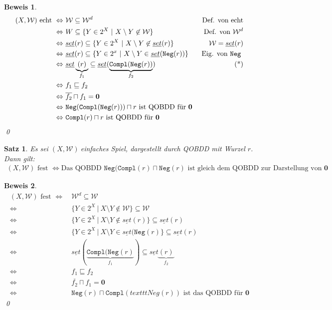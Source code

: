 \documentclass[ngerman]{scrartcl}
\theoremstyle{custom}
\newtheorem{ms}[mdef]{Satz}
\newtheorem*{bw}{Beweis}
\newcommand{\0}{\mathbf{0}}
\newcommand{\1}{\mathbf{L}}
\newcommand{\set}{\underline{set}}
\newcommand{\sg}{$(X,\mathcal{W})~$}
\newcommand{\W}{\mathcal{W}}
\begin{document}
\begin{bw}
\begin{align*}
(X,\W) \text{ echt } \Leftrightarrow&~ \W \subseteq \W^d & \text{
  Def. von echt}\\
\Leftrightarrow&~ W \subseteq \{Y \in 2^X ~|~ X \setminus Y \not \in
\W\} & \text{ Def. von } \W^d\\
\Leftrightarrow&~ \set(r) \subseteq \{Y \in 2^X ~|~ X \setminus Y \not
\in \set(r)\} & \W = \set(r)\\
\Leftrightarrow&~ \set(r) \subseteq \{Y \in 2^x ~|~ X \setminus Y \in
\set(\texttt{Neg}(r))\} & \text{ Eig. von \texttt{Neg} }\\
\Leftrightarrow&~ \set\underbrace{(r)}_{f_1} \subseteq
\set(\underbrace{\texttt{Compl}(\texttt{Neg}(r))}_{f_2}) &
\text{(*)}\\
\Leftrightarrow&~ f_1 \sqsubseteq f_2 \\
\Leftrightarrow&~ \overline{f_2} \sqcap f_1 = \0\\
\Leftrightarrow&~ \texttt{Neg}(\texttt{Compl}(\texttt{Neg}(r))) \sqcap
r \text{ ist QOBDD f\"ur } \0\\
\Leftrightarrow&~ \texttt{Compl}(r) \sqcap r \text{ ist QOBDD f\"ur } \0
\end{align*}
\qed
\end{bw}

\begin{ms}
Es sei \sg einfaches Spiel, dargestellt durch QOBDD mit Wurzel
$r$. Dann gilt:
\begin{align*}
(X,\W) \text{ fest } \Leftrightarrow \text{Das QOBDD }
\texttt{Neg}(\texttt{Compl}(r) \sqcap \texttt{Neg}(r) \text{ ist gleich
  dem QOBDD zur Darstellung von } \0
\end{align*}
\end{ms}

\begin{bw}
\begin{align*}
(X,\W) \text{ fest } \Leftrightarrow&~ \W^d \subseteq \W \\
\Leftrightarrow&~ \{Y \in 2^X ~|~ X \setminus Y \not \in \W \}
\subseteq \W\\
\Leftrightarrow&~ \{Y \in 2^X ~|~ X \setminus Y \not \in \set(r) \}
\subseteq \set(r)\\
\Leftrightarrow&~ \{Y \in 2^X ~|~ X \setminus Y \in
\set(\texttt{Neg} (r)\} \subseteq \set(r)\\
\Leftrightarrow&~
\set(\underbrace{\texttt{Compl}(\texttt{Neg}(r)}_{f_1})
\subseteq \set\underbrace{(r)}_{f_2}\\
\Leftrightarrow&~ f_1 \sqsubseteq f_2\\
\Leftrightarrow&~ \overline{f_2} \sqcap f_1 = \0\\
\Leftrightarrow&~ \texttt{Neg}(r) \sqcap
\texttt{Compl}(texttt{Neg}(r)) \text{ ist das QOBDD f\"ur } \0
\end{align*}
\qed
\end{bw}
\end{document}

